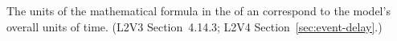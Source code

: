 The units of the mathematical formula in the  of an \Event
{} correspond to the model's overall units of time.  (L2V3
Section~4.14.3; L2V4 Section~\ref{sec:event-delay}.)
